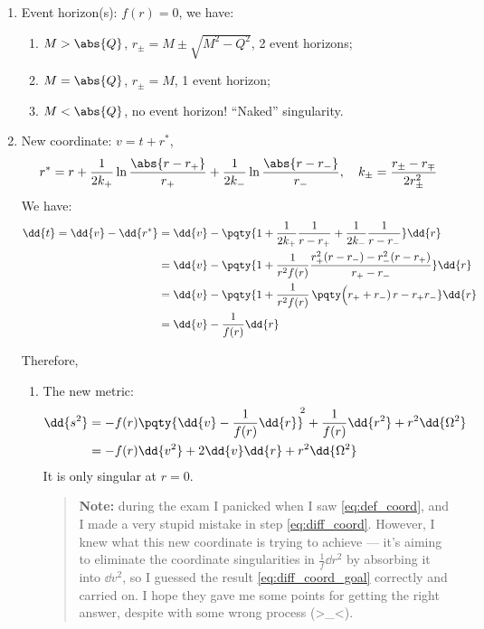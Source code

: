 \documentclass[a4paper
	,10pt
]{article}
\begin{document}
\begin{enumerate}
\item Event horizon(s): $f(r) = 0$, we have:
	\begin{enumerate}
	\item $M > \abs{Q}$, $r_\pm = M \pm \sqrt{M^2 - Q^2}$, 2 event horizons;
	\item $M = \abs{Q}$, $r_\pm = M$, 1 event horizon;
	\item $M < \abs{Q}$, no event horizon! ``Naked'' singularity.
	\end{enumerate}
	
\item New coordinate: $v = t + r^*$,
	\begin{equation}
		r^* = r
			+ \frac{1}{2k_+}
				\ln \frac{\abs{r - r_+}}{r_+}
			+ \frac{1}{2k_-}
				\ln \frac{\abs{r - r_-}}{r_-},
	\quad
		k_\pm
		= \frac{r_\pm - r_\mp}{2r_\pm^2}
	\label{eq:def_coord}
	\end{equation}
	We have:
	\begin{align}
		\dd{t}
		= \dd{v} - \dd{r^*}
		&= \dd{v} - \pqty{
				1 + \frac{1}{2k_+} \frac{1}{r - r_+}
				+ \frac{1}{2k_-} \frac{1}{r - r_-}
			} \dd{r}
		\label{eq:diff_coord}
		\\
		&= \dd{v} - \pqty{
				1 + \frac{1}{r^2 f(r)}
				\frac{
					r_+^2 (r - r_-)
					- r_-^2 (r - r_+)
				}{r_+ - r_-}
			} \dd{r} \notag\\
		&= \dd{v} - \pqty{
				1 + \frac{1}{r^2 f(r)}\,
				\pqty\Big{
					(r_+ + r_-)\,r
					- r_+ r_-
				}
			} \dd{r} \notag\\
		&= \dd{v} - \frac{1}{f(r)} \dd{r}
		\label{eq:diff_coord_goal}
	\end{align}
	
	Therefore,
	\begin{enumerate}[parsep=\parskip]
	\item The new metric:
	\begin{align}
		\dd{s^2}
		&= - f(r) \pqty{
				\dd{v}
				- \frac{1}{f(r)} \dd{r}
			}^{\!\!2}
			+ \frac{1}{f(r)} \dd{r^2}
			+ r^2 \dd{\Omega^2} \\
		&= - f(r) \dd{v^2}
			+ 2 \dd{v} \dd{r}
			+ r^2 \dd{\Omega^2} \notag
	\end{align}
	It is only singular at $r = 0$.
	
	\begin{quote}
	\textbf{Note:} during the exam I panicked when I saw \eqref{eq:def_coord}, and I made a very stupid mistake in step \eqref{eq:diff_coord}. However, I knew what this new coordinate is trying to achieve --- it's aiming to eliminate the coordinate singularities in $\frac{1}{f} \dd{r^2}$ by absorbing it into $\dd{v^2}$, so I guessed the result \eqref{eq:diff_coord_goal} correctly and carried on. I hope they gave me some points for getting the right answer, despite with some wrong process (>\_<).
	\end{quote}
	

\end{enumerate}
\end{enumerate}
\end{document}
